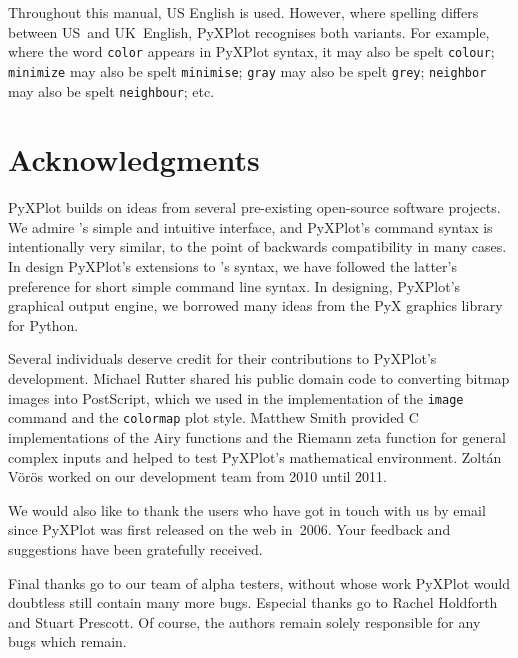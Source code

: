 Throughout this manual, US English is used. However, where spelling differs
between US~and UK~English, PyXPlot recognises both variants. For example, where
the word \texttt{color} appears in PyXPlot syntax, it may also be spelt
\texttt{colour}; \texttt{minimize} may also be spelt \texttt{minimise};
\texttt{gray} may also be spelt \texttt{grey}; \texttt{neighbor} may also be
spelt \texttt{neighbour}; etc.

\section{Acknowledgments}

PyXPlot builds on ideas from several pre-existing open-source software
projects.  We admire \gnuplot's simple and intuitive interface, and PyXPlot's
command syntax is intentionally very similar, to the point of backwards
compatibility in many cases. In design PyXPlot's extensions to \gnuplot's
syntax, we have followed the latter's preference for short simple command line
syntax.  In designing, PyXPlot's graphical output engine, we borrowed many
ideas from the PyX graphics library for Python.

Several individuals deserve credit for their contributions to PyXPlot's
development. Michael Rutter shared his public domain code to converting bitmap
images into PostScript, which we used in the implementation of the {\tt image}
command and the {\tt colormap} plot style. Matthew Smith provided C
implementations of the Airy functions and the Riemann zeta function for general
complex inputs and helped to test PyXPlot's mathematical environment. Zolt\'an
V\"or\"os worked on our development team from 2010 until 2011.

We would also like to thank the users who have got in touch with us by email
since PyXPlot was first released on the web in~2006. Your feedback and
suggestions have been gratefully received.

Final thanks go to our team of alpha testers, without whose work PyXPlot would
doubtless still contain many more bugs.  Especial thanks go to Rachel Holdforth
and Stuart Prescott. Of course, the authors remain solely responsible for any
bugs which remain.

